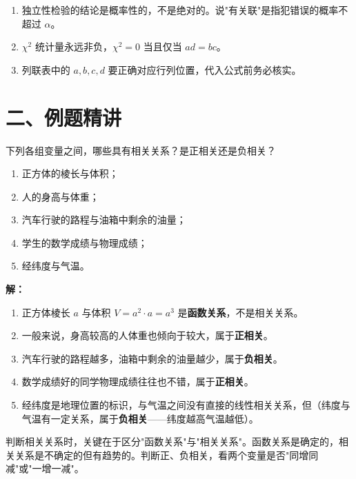 \documentclass[12pt, a4paper]{ctexart}
\begin{document}
\begin{warnbox}[易错提醒]
\begin{enumerate}[leftmargin=2em]
  \item 独立性检验的结论是概率性的，不是绝对的。说"有关联"是指犯错误的概率不超过 $\alpha$。
  \item $\chi^2$ 统计量永远非负，$\chi^2 = 0$ 当且仅当 $ad = bc$。
  \item 列联表中的 $a, b, c, d$ 要正确对应行列位置，代入公式前务必核实。
\end{enumerate}
\end{warnbox}

\newpage

\section*{\textcolor{examorange}{二、例题精讲}}

\begin{examplebox}[【例1】判断相关关系类型]
下列各组变量之间，哪些具有相关关系？是正相关还是负相关？
\begin{enumerate}[label=(\arabic*)]
  \item 正方体的棱长与体积；
  \item 人的身高与体重；
  \item 汽车行驶的路程与油箱中剩余的油量；
  \item 学生的数学成绩与物理成绩；
  \item 经纬度与气温。
\end{enumerate}
\end{examplebox}

\textbf{解：}
\begin{enumerate}[label=(\arabic*)]
  \item 正方体棱长 $a$ 与体积 $V = a^2 \cdot a = a^3$ 是\textbf{函数关系}，不是相关关系。
  \item 一般来说，身高较高的人体重也倾向于较大，属于\textbf{正相关}。
  \item 汽车行驶的路程越多，油箱中剩余的油量越少，属于\textbf{负相关}。
  \item 数学成绩好的同学物理成绩往往也不错，属于\textbf{正相关}。
  \item 经纬度是地理位置的标识，与气温之间没有直接的线性相关关系，但（纬度与气温有一定关系，属于\textbf{负相关}——纬度越高气温越低）。
\end{enumerate}

\begin{tipbox}[方法总结]
判断相关关系时，关键在于区分"函数关系"与"相关关系"。函数关系是确定的，相关关系是不确定的但有趋势的。判断正、负相关，看两个变量是否"同增同减"或"一增一减"。
\end{tipbox}
\end{document}
